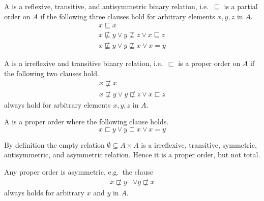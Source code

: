 

\begin{definition}
	A  is a reflexive, transitive, and antisymmetric binary relation,
	i.e.~\( \sqsubseteq \) is a partial order on \( A \) if
	the following three clauses hold for arbitrary elements \( x,y,z \) in \( A \).
	\begin{align*}
	x\sqsubseteq x
	\tag*{reflexivity}
	\\
	x\not\sqsubseteq y \lor  y \not\sqsubseteq z \lor x\sqsubseteq z
	\tag*{transitivity}
	\\
	x\not\sqsubseteq y \lor y\not\sqsubseteq x \lor x = y
	\tag*{antisymmetry}
	\end{align*}
\end{definition}

\begin{definition}
	A  is a irreflexive and transitive binary relation,
	i.e.~\( \sqsubset \) is a proper order on \( A \) if the following two clauses hold.
	\begin{align*}
	x\not\sqsubset x
	\tag*{irreflexivity}
	\\
	x\not\sqsubset y \lor  y \not\sqsubset z \lor x\sqsubset z
	\tag*{transitivity}
	\end{align*}
	always hold for arbitrary elements \( x,y,z \) in \( A \).
\end{definition}

\begin{definition}
	A  is a proper order where the following clause holds.
	\[
		x \sqsubset y \lor y \sqsubset x  \lor x=y \tag*{totality}
	\]
\end{definition}

\begin{example}
	By definition the empty relation \( \emptyset \subseteq A \times A \) is a
	irreflexive,
	transitive,
	symmetric,
	antisymmetric,
	and asymmetric
	relation.
	Hence it is a proper order, but not total.
\end{example}

\begin{lemma}
	Any proper order is asymmetric, e.g.~the clause
	\begin{align*}
	x\not\sqsubset y &\lor y\not\sqsubset x \tag*{asymmetry}
	\end{align*}
	always holds for arbitrary \( x \) and \( y \) in \( A \).
\end{lemma}

